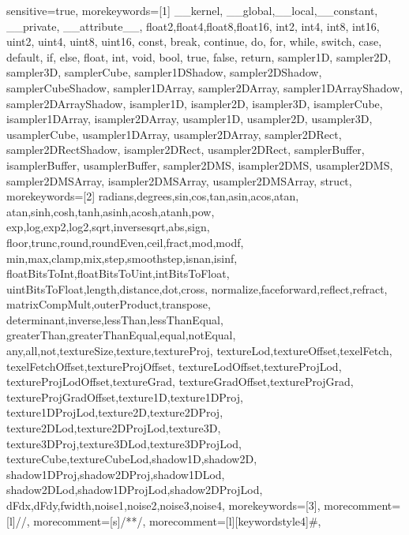 {
 sensitive=true,
 morekeywords=[1]{
  __kernel, __global,__local,__constant, __private, __attribute__,
  float2,float4,float8,float16,
  int2, int4, int8, int16,
  uint2, uint4, uint8, uint16,
  const,
  break, continue, do,
  for, while, 
  switch, case, default, 
  if, else,
  float, int, void,
  bool, true, false,
  return,
  sampler1D, sampler2D, sampler3D,
  samplerCube, sampler1DShadow,
  sampler2DShadow, samplerCubeShadow,
  sampler1DArray, sampler2DArray,
  sampler1DArrayShadow, sampler2DArrayShadow,
  isampler1D, isampler2D, isampler3D,
  isamplerCube, isampler1DArray,
  isampler2DArray, usampler1D, usampler2D,
  usampler3D, usamplerCube, usampler1DArray,
  usampler2DArray, sampler2DRect,
  sampler2DRectShadow, isampler2DRect,
  usampler2DRect, samplerBuffer,
  isamplerBuffer, usamplerBuffer, sampler2DMS,
  isampler2DMS, usampler2DMS,
  sampler2DMSArray, isampler2DMSArray,
  usampler2DMSArray, struct},
 morekeywords=[2]{
  radians,degrees,sin,cos,tan,asin,acos,atan,
  atan,sinh,cosh,tanh,asinh,acosh,atanh,pow,
  exp,log,exp2,log2,sqrt,inversesqrt,abs,sign,
  floor,trunc,round,roundEven,ceil,fract,mod,modf,
  min,max,clamp,mix,step,smoothstep,isnan,isinf,
  floatBitsToInt,floatBitsToUint,intBitsToFloat,
  uintBitsToFloat,length,distance,dot,cross,
  normalize,faceforward,reflect,refract,
  matrixCompMult,outerProduct,transpose,
  determinant,inverse,lessThan,lessThanEqual,
  greaterThan,greaterThanEqual,equal,notEqual,
  any,all,not,textureSize,texture,textureProj,
  textureLod,textureOffset,texelFetch,
  texelFetchOffset,textureProjOffset,
  textureLodOffset,textureProjLod,
  textureProjLodOffset,textureGrad,
  textureGradOffset,textureProjGrad,
  textureProjGradOffset,texture1D,texture1DProj,
  texture1DProjLod,texture2D,texture2DProj,
  texture2DLod,texture2DProjLod,texture3D,
  texture3DProj,texture3DLod,texture3DProjLod,
  textureCube,textureCubeLod,shadow1D,shadow2D,
  shadow1DProj,shadow2DProj,shadow1DLod,
  shadow2DLod,shadow1DProjLod,shadow2DProjLod,
  dFdx,dFdy,fwidth,noise1,noise2,noise3,noise4},
 morekeywords=[3]{},
 morecomment=[l]{//},
 morecomment=[s]{/*}{*/},
 morecomment=[l][keywordstyle4]{\#},
}








